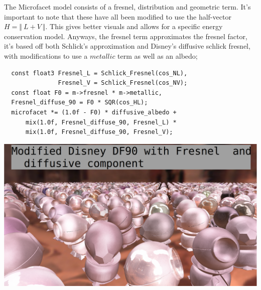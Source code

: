 \documentclass{article}
\begin{document}
  The Microfacet model consists of a fresnel, distribution and geometric term.
It's important to note that these have all been modified to use the half-vector
$H = \Vert\:L+V\:\Vert$. This gives better visuals and allows for a specific
energy conservation model. Anyways, the fresnel term approximates the fresnel
factor, it's based off both Schlick's approximation and Disney's diffusive
schlick fresnel, with modifications to use a $metallic$ term as well as an
albedo;
  \begin{lstlisting}
  const float3 Fresnel_L = Schlick_Fresnel(cos_NL),
               Fresnel_V = Schlick_Fresnel(cos_NV);
  const float F0 = m->fresnel * m->metallic,
  Fresnel_diffuse_90 = F0 * SQR(cos_HL);
  microfacet *= (1.0f - F0) * diffusive_albedo +
      mix(1.0f, Fresnel_diffuse_90, Fresnel_L) *
      mix(1.0f, Fresnel_diffuse_90, Fresnel_V);
  \end{lstlisting}
  \includegraphics[scale=0.20]{fresnel}
  
\end{document}
